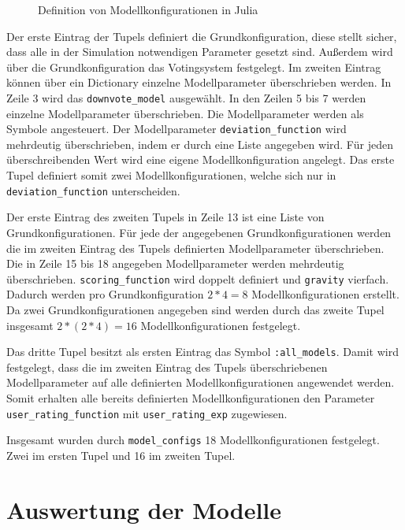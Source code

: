 \begin{figure}[!h]
	\caption{Definition von Modellkonfigurationen in Julia}
	
	\label{conf}
\end{figure}


Der erste Eintrag der Tupels definiert die Grundkonfiguration, diese stellt sicher, dass alle in der Simulation notwendigen Parameter gesetzt sind. Außerdem wird über die Grundkonfiguration das Votingsystem festgelegt. Im zweiten Eintrag können über ein Dictionary einzelne Modellparameter überschrieben werden. In Zeile 3 wird das \texttt{downvote\_model} ausgewählt. In den Zeilen 5 bis 7 werden einzelne Modellparameter überschrieben. Die Modellparameter werden als Symbole angesteuert. Der Modellparameter \texttt{deviation\_function} wird mehrdeutig überschrieben, indem er durch eine Liste angegeben wird. Für jeden überschreibenden Wert wird eine eigene Modellkonfiguration angelegt. Das erste Tupel definiert somit zwei Modellkonfigurationen, welche sich nur in \texttt{deviation\_function} unterscheiden. 

Der erste Eintrag des zweiten Tupels in Zeile 13 ist eine Liste von Grundkonfigurationen. Für jede der angegebenen Grundkonfigurationen werden die im zweiten Eintrag des Tupels definierten Modellparameter überschrieben. Die in Zeile 15 bis 18 angegeben Modellparameter werden mehrdeutig überschrieben. \texttt{scoring\_function} wird doppelt definiert und \texttt{gravity} vierfach. Dadurch werden pro Grundkonfiguration $2 * 4 = 8$ Modellkonfigurationen erstellt. Da zwei Grundkonfigurationen angegeben sind werden durch das zweite Tupel insgesamt $2 * (2* 4) = 16$ Modellkonfigurationen festgelegt. 

Das dritte Tupel besitzt als ersten Eintrag das Symbol \texttt{:all\_models}. Damit wird festgelegt, dass die im zweiten Eintrag des Tupels überschriebenen Modellparameter auf alle definierten Modellkonfigurationen angewendet werden.
Somit erhalten alle bereits definierten Modellkonfigurationen den Parameter \texttt{user\_rating\_function} mit \texttt{user\_rating\_exp} zugewiesen.

Insgesamt wurden durch \texttt{model\_configs} 18 Modellkonfigurationen festgelegt. Zwei im ersten Tupel und 16 im zweiten Tupel.


\section{Auswertung der Modelle}
\label{sec:auswertung}

